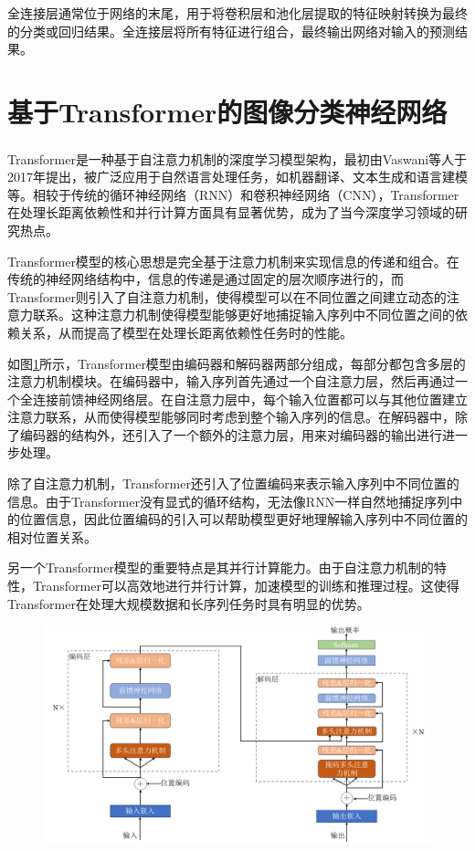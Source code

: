 全连接层通常位于网络的末尾，用于将卷积层和池化层提取的特征映射转换为最终的分类或回归结果。全连接层将所有特征进行组合，最终输出网络对输入的预测结果。


\section{基于Transformer的图像分类神经网络}
Transformer\textsuperscript{\cite{bengio2013representation}}是一种基于自注意力机制的深度学习模型架构，最初由Vaswani等人于2017年提出，被广泛应用于自然语言处理任务，如机器翻译、文本生成和语言建模等。相较于传统的循环神经网络（RNN）和卷积神经网络（CNN），Transformer在处理长距离依赖性和并行计算方面具有显著优势，成为了当今深度学习领域的研究热点。

Transformer模型的核心思想是完全基于注意力机制来实现信息的传递和组合。在传统的神经网络结构中，信息的传递是通过固定的层次顺序进行的，而Transformer则引入了自注意力机制，使得模型可以在不同位置之间建立动态的注意力联系。这种注意力机制使得模型能够更好地捕捉输入序列中不同位置之间的依赖关系，从而提高了模型在处理长距离依赖性任务时的性能。

如图\ref{fig:vit1}所示，Transformer模型由编码器和解码器两部分组成，每部分都包含多层的注意力机制模块。在编码器中，输入序列首先通过一个自注意力层，然后再通过一个全连接前馈神经网络层。在自注意力层中，每个输入位置都可以与其他位置建立注意力联系，从而使得模型能够同时考虑到整个输入序列的信息。在解码器中，除了编码器的结构外，还引入了一个额外的注意力层，用来对编码器的输出进行进一步处理。

除了自注意力机制，Transformer还引入了位置编码来表示输入序列中不同位置的信息。由于Transformer没有显式的循环结构，无法像RNN一样自然地捕捉序列中的位置信息，因此位置编码的引入可以帮助模型更好地理解输入序列中不同位置的相对位置关系。

另一个Transformer模型的重要特点是其并行计算能力。由于自注意力机制的特性，Transformer可以高效地进行并行计算，加速模型的训练和推理过程。这使得Transformer在处理大规模数据和长序列任务时具有明显的优势。


\begin{figure}[h]
	\centering 
	\includegraphics[width=12cm]{fig/ch2/vit1.png}
	\label{fig:vit1}
\end{figure}

